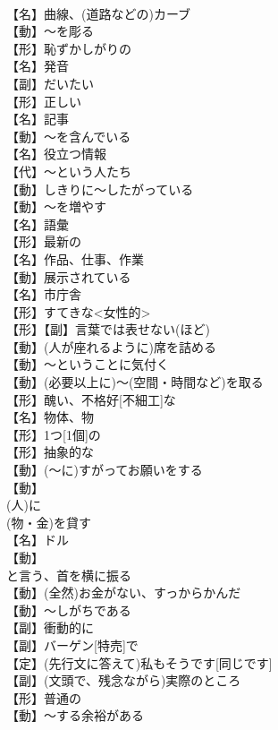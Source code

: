 \documentclass[8pt]{extreport}
\begin{document}
\begin{CJK}{UTF8}{min}
\\	【名】曲線、(道路などの)カーブ
\\	【動】～を彫る
\\	【形】恥ずかしがりの
\\	【名】発音
\\	【副】だいたい
\\	【形】正しい
\\	【名】記事
\\	【動】～を含んでいる
\\	【名】役立つ情報
\\	【代】～という人たち
\\	【動】しきりに～したがっている
\\	【動】～を増やす
\\	【名】語彙
\\	【形】最新の
\\	【名】作品、仕事、作業
\\	【動】展示されている
\\	【名】市庁舎
\\	【形】すてきな<女性的>
\\	【形】【副】言葉では表せない(ほど)
\\	【動】(人が座れるように)席を詰める
\\	【動】～ということに気付く
\\	【動】(必要以上に)～(空間・時間など)を取る
\\	【形】醜い、不格好[不細工]な
\\	【名】物体、物
\\	【形】1つ[1個]の
\\	【形】抽象的な
\\	【動】(～に)すがってお願いをする
\\	【動】
\\	(人)に
\\	(物・金)を貸す
\\	【名】ドル
\\	【動】
\\	と言う、首を横に振る
\\	【動】(全然)お金がない、すっからかんだ
\\	【動】～しがちである
\\	【副】衝動的に
\\	【副】バーゲン[特売]で
\\	【定】(先行文に答えて)私もそうです[同じです]
\\	【副】(文頭で、残念ながら)実際のところ
\\	【形】普通の
\\	【動】～する余裕がある

\end{CJK}
\end{document}
